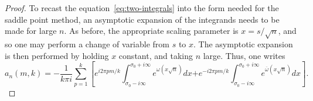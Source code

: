 \documentclass{amsart}
\begin{document}
\begin{proof}
% 

To recast the equation~\eqref{eq:two-integrals} into the form needed
for the saddle point method, an asymptotic expansion of the
integrands needs to be made for large $n$. 
As before, the appropriate scaling parameter is $x=s/\sqrt{n}$,
and so one may perform a change of variable from $s$ to $x$. The asymptotic
expansion is then performed by holding $x$ constant, and taking $n$
large. Thus, one writes 
\begin{equation}\label{eq:saddle}
a_{n}(m,k) = -\frac{1}{k\pi i}\sum_{p=1}^{k}
\left[e^{i {2\pi pm}/{k}}
\int_{\sigma_{0}-i\infty}^{\sigma_{0}+i\infty}e^{\omega(x\sqrt{n})}dx\right.
\left.+e^{-i{2\pi pm}/{k}}
\int_{\sigma_{0}-i\infty}^{\sigma_{0}+i\infty}
e^{\overline{\omega}(x\sqrt{n})}dx\right].
\end{equation}


\end{proof}
\end{document}
